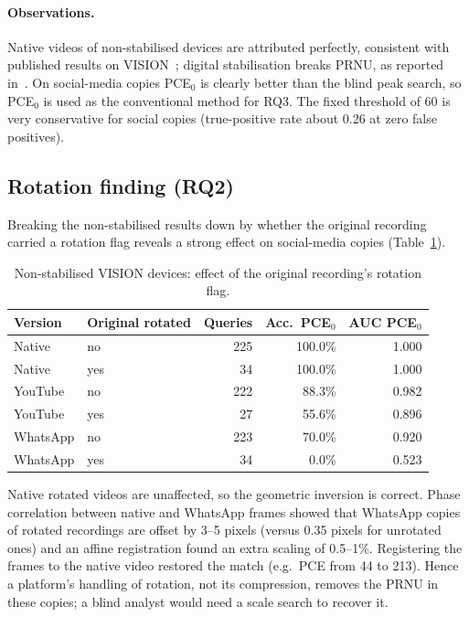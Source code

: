 \documentclass[11pt,a4paper]{article}
\begin{document}
\paragraph{Observations.}
Native videos of non-stabilised devices are attributed perfectly, consistent with published results
on VISION~\cite{vision}; digital stabilisation breaks PRNU, as reported in~\cite{mandelli}. On
social-media copies PCE$_0$ is clearly better than the blind peak search, so PCE$_0$ is used as the
conventional method for RQ3. The fixed threshold of 60 is very conservative for social copies
(true-positive rate about 0.26 at zero false positives).

\subsection{Rotation finding (RQ2)}
Breaking the non-stabilised results down by whether the original recording carried a rotation flag
reveals a strong effect on social-media copies (Table~\ref{tab:rotation}).

\begin{table}[H]
\centering\small
\caption{Non-stabilised VISION devices: effect of the original recording's rotation flag.}
\label{tab:rotation}
\begin{tabular}{llrrr}
\toprule
Version & Original rotated & Queries & Acc.\ PCE$_0$ & AUC PCE$_0$ \\
\midrule
Native   & no  & 225 & 100.0\% & 1.000 \\
Native   & yes &  34 & 100.0\% & 1.000 \\
YouTube  & no  & 222 &  88.3\% & 0.982 \\
YouTube  & yes &  27 &  55.6\% & 0.896 \\
WhatsApp & no  & 223 &  70.0\% & 0.920 \\
WhatsApp & yes &  34 &   0.0\% & 0.523 \\
\bottomrule
\end{tabular}
\end{table}

Native rotated videos are unaffected, so the geometric inversion is correct. Phase correlation
between native and WhatsApp frames showed that WhatsApp copies of rotated recordings are offset by
3--5 pixels (versus 0.35 pixels for unrotated ones) and an affine registration found an extra scaling
of 0.5--1\%. Registering the frames to the native video restored the match (e.g.\ PCE from 44 to 213).
Hence a platform's handling of rotation, not its compression, removes the PRNU in these copies; a blind
analyst would need a scale search to recover it.
\end{document}
